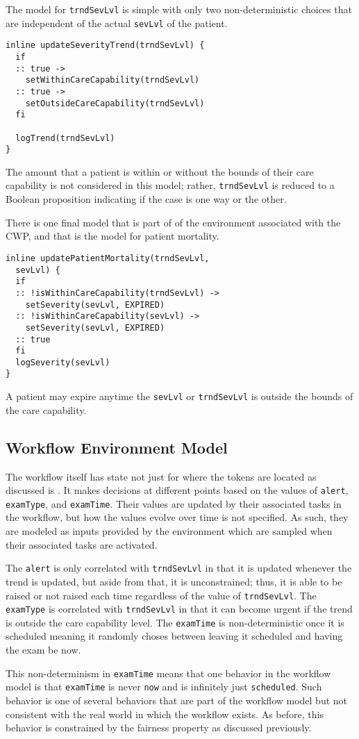 The model for \texttt{trndSevLvl} is simple with only two non-deterministic choices that are independent of the actual \texttt{sevLvl} of the patient. 
%
{\small
\begin{lstlisting}[style=myPromela]
inline updateSeverityTrend(trndSevLvl) {
  if
  :: true -> 
    setWithinCareCapability(trndSevLvl)
  :: true -> 
    setOutsideCareCapability(trndSevLvl)
  fi

  logTrend(trndSevLvl)
}
\end{lstlisting}
}
%
\noindent The amount that a patient is within or without the bounds of their care capability is not considered in this model; rather, \texttt{trndSevLvl} is reduced to a Boolean proposition indicating if the case is one way or the other.

There is one final model that is part of of the environment associated with the CWP, and that is the model for patient mortality. 
%
{\small
\begin{lstlisting}[style=myPromela]
inline updatePatientMortality(trndSevLvl, 
  sevLvl) {
  if
  :: !isWithinCareCapability(trndSevLvl) -> 
    setSeverity(sevLvl, EXPIRED)
  :: !isWithinCareCapability(sevLvl) ->
    setSeverity(sevLvl, EXPIRED)
  :: true
  fi
  logSeverity(sevLvl)
}
\end{lstlisting}
}
%
\noindent A patient may expire anytime the \texttt{sevLvl} or \texttt{trndSevLvl} is outside the bounds of the care capability.

\subsection{Workflow Environment Model}

 The workflow itself has state not just for where the tokens are located as discussed is . It makes decisions at different points based on the values of \texttt{alert}, \texttt{examType}, and \texttt{examTime}. Their values are updated by their associated tasks in the workflow, but how the values evolve over time is not specified. As such, they are modeled as inputs provided by the environment which are sampled when their associated tasks are activated.

The \texttt{alert} is only correlated with \texttt{trndSevLvl} in that it is updated whenever the trend is updated, but aside from that, it is unconstrained; thus, it is able to be raised or not raised each time regardless of the value of \texttt{trndSevLvl}. The \texttt{examType} is correlated with \texttt{trndSevLvl} in that it can become urgent if the trend is outside the care capability level. The \texttt{examTime} is non-deterministic once it is scheduled meaning it randomly choses between leaving it scheduled and having the exam be now.

This non-determinism in \texttt{examTime} means that one behavior in the workflow model is that \texttt{examTime} is never \texttt{now} and is infinitely just \texttt{scheduled}. Such behavior is one of several behaviors that are part of the workflow model but not consistent with the real world in which the workflow exists. As before, this behavior is constrained by the fairness property as discussed previously.
